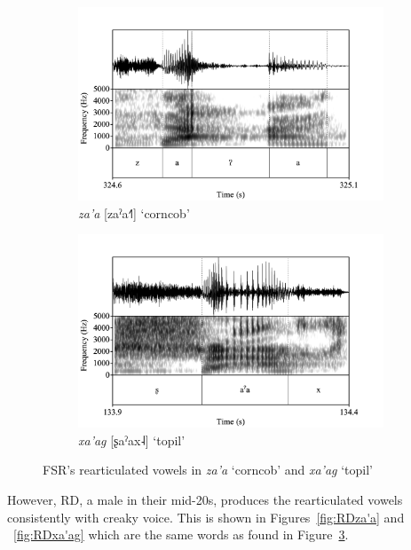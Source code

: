 \begin{figure}[h!]
	\centering
	\begin{subfigure}{.5\textwidth}
		\centering
		\includegraphics[width=\linewidth]{Images/Spectrograms/za'a.png}
		\caption{\textit{za'a} [zaˀa˧˥] `corncob'}
		\label{fig:FSRza'a}
	\end{subfigure}%
	\begin{subfigure}{.5\textwidth}
		\centering
		\includegraphics[width=\linewidth]{Images/Spectrograms/xa'ag.png}
		\caption{\textit{xa'ag} [ʂaˀax˨] `topil'}
		\label{fig:FSRxa'ag}
	\end{subfigure}	
	\caption{FSR's rearticulated vowels in \textit{za'a} `corncob' and \textit{xa'ag} `topil'}
	\label{fig:FSRLaryngeal}
\end{figure}

However, RD, a male in their mid-20s, produces the rearticulated vowels consistently with creaky voice. This is shown in Figures~\ref{fig:RDza'a} and ~\ref{fig:RDxa'ag} which are the same words as found in Figure~\ref{fig:FSRLaryngeal}. 

